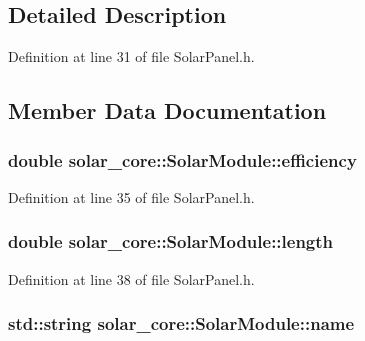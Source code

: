 \subsection{Detailed Description}


Definition at line 31 of file Solar\+Panel.\+h.



\subsection{Member Data Documentation}
\hypertarget{classsolar__core_1_1_solar_module_a0303a0da750be23a4a408645d838ed24}{}
\subsubsection[{efficiency}]{\setlength{\rightskip}{0pt plus 5cm}double solar\+\_\+core\+::\+Solar\+Module\+::efficiency}\label{classsolar__core_1_1_solar_module_a0303a0da750be23a4a408645d838ed24}


Definition at line 35 of file Solar\+Panel.\+h.

\hypertarget{classsolar__core_1_1_solar_module_a34cc7ce18770e51c87a3655f6f481be0}{}
\subsubsection[{length}]{\setlength{\rightskip}{0pt plus 5cm}double solar\+\_\+core\+::\+Solar\+Module\+::length}\label{classsolar__core_1_1_solar_module_a34cc7ce18770e51c87a3655f6f481be0}


Definition at line 38 of file Solar\+Panel.\+h.

\hypertarget{classsolar__core_1_1_solar_module_abc9bb9bae1546dee017d598ef7baa952}{}
\subsubsection[{name}]{\setlength{\rightskip}{0pt plus 5cm}std\+::string solar\+\_\+core\+::\+Solar\+Module\+::name}\label{classsolar__core_1_1_solar_module_abc9bb9bae1546dee017d598ef7baa952}


